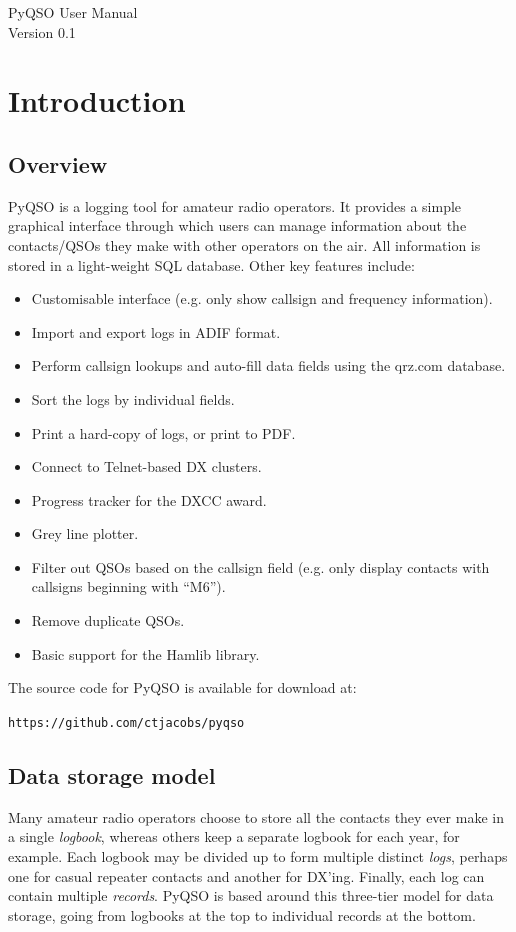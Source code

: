 \documentclass[11pt, a4paper]{report}
\begin{document}
\begin{titlepage}
\begin{center}
\vspace*{5cm}
\huge{PyQSO User Manual}\\\vspace*{5cm}
\LARGE{Version 0.1}
\end{center}
\end{titlepage}

\tableofcontents

\chapter{Introduction}\label{chap:introduction}
\section{Overview}
PyQSO is a logging tool for amateur radio operators. It provides a simple graphical interface through which users can manage information about the contacts/QSOs they make with other operators on the air. All information is stored in a light-weight SQL database. Other key features include:
\begin{itemize}
  \item Customisable interface (e.g. only show callsign and frequency information).
  \item Import and export logs in ADIF format.
  \item Perform callsign lookups and auto-fill data fields using the qrz.com database.
  \item Sort the logs by individual fields.
  \item Print a hard-copy of logs, or print to PDF.
  \item Connect to Telnet-based DX clusters.
  \item Progress tracker for the DXCC award.
  \item Grey line plotter.
  \item Filter out QSOs based on the callsign field (e.g. only display contacts with callsigns beginning with ``M6'').
  \item Remove duplicate QSOs.
  \item Basic support for the Hamlib library.
\end{itemize}
The source code for PyQSO is available for download at:

\texttt{https://github.com/ctjacobs/pyqso}

\section{Data storage model}
Many amateur radio operators choose to store all the contacts they ever make in a single \textit{logbook}, whereas others keep a separate logbook for each year, for example. Each logbook may be divided up to form multiple distinct \textit{logs}, perhaps one for casual repeater contacts and another for DX'ing. Finally, each log can contain multiple \textit{records}. PyQSO is based around this three-tier model for data storage, going from logbooks at the top to individual records at the bottom. 
\end{document}
